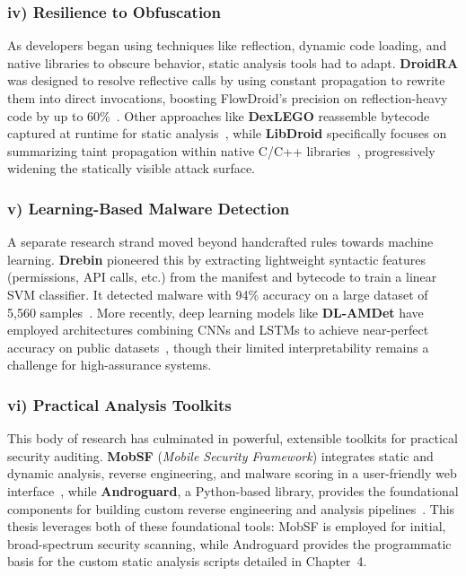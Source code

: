 \documentclass[a4paper,12pt]{report}
\begin{document}
\subsubsection{iv) Resilience to Obfuscation}
As developers began using techniques like reflection, dynamic code loading, and native libraries to obscure behavior, static analysis tools had to adapt. \textbf{DroidRA} was designed to resolve reflective calls by using constant propagation to rewrite them into direct invocations, boosting FlowDroid’s precision on reflection-heavy code by up to 60\%~\cite{li2016droidra}. Other approaches like \textbf{DexLEGO} reassemble bytecode captured at runtime for static analysis~\cite{ning2019dexlego}, while \textbf{LibDroid} specifically focuses on summarizing taint propagation within native C/C++ libraries~\cite{libdroid2022}, progressively widening the statically visible attack surface.

\subsubsection{v) Learning-Based Malware Detection}
A separate research strand moved beyond handcrafted rules towards machine learning. \textbf{Drebin} pioneered this by extracting lightweight syntactic features (permissions, API calls, etc.) from the manifest and bytecode to train a linear SVM classifier. It detected malware with 94\% accuracy on a large dataset of 5,560 samples~\cite{arp2014drebin}. More recently, deep learning models like \textbf{DL-AMDet} have employed architectures combining CNNs and LSTMs to achieve near-perfect accuracy on public datasets~\cite{nasser2023dlamdet}, though their limited interpretability remains a challenge for high-assurance systems.

\subsubsection{vi) Practical Analysis Toolkits}
This body of research has culminated in powerful, extensible toolkits for practical security auditing. \textbf{MobSF} (\emph{Mobile Security Framework}) integrates static and dynamic analysis, reverse engineering, and malware scoring in a user-friendly web interface~\cite{mobsf2023}, while \textbf{Androguard}, a Python-based library, provides the foundational components for building custom reverse engineering and analysis pipelines~\cite{androguard2023}. This thesis leverages both of these foundational tools: MobSF is employed for initial, broad-spectrum security scanning, while Androguard provides the programmatic basis for the custom static analysis scripts detailed in Chapter~4.
\end{document}
